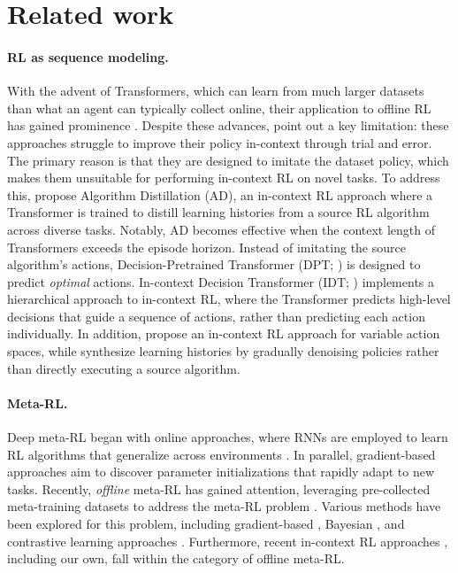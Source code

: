 \documentclass{article}
\begin{document}
\section{Related work}
\label{sec:rel}
\paragraph*{RL as sequence modeling.}
With the advent of Transformers, which can learn from much larger datasets than what an agent can typically collect online, their application to offline RL \citep{offlineRL} has gained prominence \citep{DT, TTO, MGDT, GATO}.
Despite these advances, \citet{AD} point out a key limitation: these approaches struggle to improve their policy in-context through trial and error.
The primary reason is that they are designed to imitate the dataset policy, which makes them unsuitable for performing in-context RL on novel tasks.
To address this, \citet{AD} propose Algorithm Distillation (AD), an in-context RL approach where a Transformer is trained to distill learning histories from a source RL algorithm across diverse tasks.
Notably, AD becomes effective when the context length of Transformers exceeds the episode horizon.
Instead of imitating the source algorithm's actions, Decision-Pretrained Transformer (DPT; \citet{DPT}) is designed to predict \emph{optimal} actions.
In-context Decision Transformer (IDT; \citet{IDT}) implements a hierarchical approach to in-context RL, where the Transformer predicts high-level decisions that guide a sequence of actions, rather than predicting each action individually.
In addition, \citet{Headless-AD} propose an in-context RL approach for variable action spaces, while \citet{AD-eps} synthesize learning histories by gradually denoising policies rather than directly executing a source algorithm.

\paragraph*{Meta-RL.}
Deep meta-RL began with online approaches, where RNNs are employed to learn RL algorithms that generalize across environments \citep{RL2, LtoRL}.
In parallel, gradient-based approaches \citep{MAML, Reptile} aim to discover parameter initializations that rapidly adapt to new tasks.
Recently, \emph{offline} meta-RL has gained attention, leveraging pre-collected meta-training datasets to address the meta-RL problem \citep{MACAW,BOReL,CORRO,IDAQ,MoSS}.
Various methods have been explored for this problem, including gradient-based \citep{MACAW}, Bayesian \citep{BOReL}, and contrastive learning approaches \citep{CORRO}.
Furthermore, recent in-context RL approaches \citep{AD, DPT, IDT, Headless-AD}, including our own, fall within the category of offline meta-RL.
\end{document}
